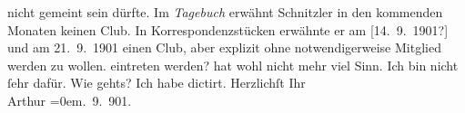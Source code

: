 \begin{ledgroupsized}[t]{13cm}
{{{                  nicht gemeint sein dürfte. Im \emph{Tagebuch}
                  erwähnt Schnitzler in den kommenden Monaten
                  keinen Club. In Korrespondenzstücken erwähnte er am [14. 9. 1901?] und am 21. 9. 1901
                     einen Club, aber explizit ohne notwendigerweise Mitglied werden
                     zu wollen.}}}\label{K_L01167-1h} eintreten werden? hat wohl nicht mehr viel Sinn. Ich bin nicht
               ſehr dafür. Wie gehts? Ich habe dictirt.\pend
           \pstart
           Herzlichſt Ihr{\\[\baselineskip]}\spacefill\mbox{Arthur}\pend
           \leftskip=0em{}. 9. 901.\pend
           
         
         \endnumbering{}\end{ledgroupsized}  \newcommand{\dateiname}{L01167}\newcommand{\titel}{Arthur Schnitzler an Richard Beer-Hofmann, 6. 9. 1901}\newcommand{\editorInnen}{Martin Anton Müller und Gerd-Hermann Susen}
      